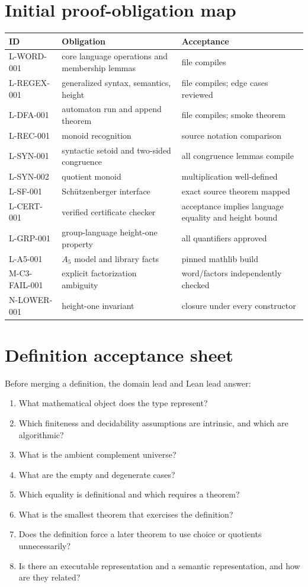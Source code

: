 \documentclass{amsart}
\begin{document}
\appendix
\section{Initial proof-obligation map}

\begin{longtable}{@{}p{}p{}p{}@{}}
\toprule
ID & Obligation & Acceptance\\
\midrule
\endhead
L-WORD-001 & core language operations and membership lemmas & file compiles\\
L-REGEX-001 & generalized syntax, semantics, height & file compiles; edge cases reviewed\\
L-DFA-001 & automaton run and append theorem & file compiles; smoke theorem\\
L-REC-001 & monoid recognition & source notation comparison\\
L-SYN-001 & syntactic setoid and two-sided congruence & all congruence lemmas compile\\
L-SYN-002 & quotient monoid & multiplication well-defined\\
L-SF-001 & Sch\"utzenberger interface & exact source theorem mapped\\
L-CERT-001 & verified certificate checker & acceptance implies language equality and height bound\\
L-GRP-001 & group-language height-one property & all quantifiers approved\\
L-A5-001 & $A_5$ model and library facts & pinned mathlib build\\
M-C3-FAIL-001 & explicit factorization ambiguity & word/factors independently checked\\
N-LOWER-001 & height-one invariant & closure under every constructor\\
\bottomrule
\end{longtable}

\section{Definition acceptance sheet}

Before merging a definition, the domain lead and Lean lead answer:
\begin{enumerate}
  \item What mathematical object does the type represent?
  \item Which finiteness and decidability assumptions are intrinsic, and which are algorithmic?
  \item What is the ambient complement universe?
  \item What are the empty and degenerate cases?
  \item Which equality is definitional and which requires a theorem?
  \item What is the smallest theorem that exercises the definition?
  \item Does the definition force a later theorem to use choice or quotients unnecessarily?
  \item Is there an executable representation and a semantic representation, and how are they related?
\end{enumerate}
\end{document}
